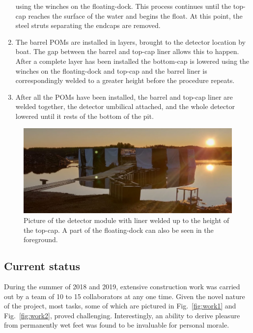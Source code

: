 \begin{enumerate}
          using the winches on the floating-dock. This process continues until the top-cap reaches
          the surface of the water and begins the float. At this point, the steel struts
          separating the endcaps are removed.
    \item The barrel POMs are installed in layers, brought to the detector location by boat. The
          gap between the barrel and top-cap liner allows this to happen. After a complete layer
          has been installed the bottom-cap is lowered using the winches on the floating-dock and
          top-cap and the barrel liner is correspondingly welded to a greater height before the
          procedure repeats.
    \item After all the POMs have been installed, the barrel and top-cap liner are welded
          together, the detector umbilical attached, and the whole detector lowered until it rests
          of the bottom of the pit.
\end{enumerate}

\begin{figure} %
    \includegraphics[width=\textwidth]{diagrams/4-chips/chips_with_liner_sun.jpeg}
    \caption[Picture of the \chipsfive detector module with liner]
    {Picture of the \chipsfive detector module with liner welded up to the height of the top-cap.
        A part of the floating-dock can also be seen in the foreground.}
    \label{fig:chips_with_liner}
\end{figure}

\subsection{Current status} %
\label{sec:chips_detector_status} %

During the summer of 2018 and 2019, extensive \chipsfive construction work was carried out by a
team of 10 to 15 collaborators at any one time. Given the novel nature of the project, most tasks,
some of which are pictured in Fig.~\ref{fig:work1} and Fig.~\ref{fig:work2}, proved challenging.
Interestingly, an ability to derive pleasure from permanently wet feet was found to be invaluable
for personal morale.

